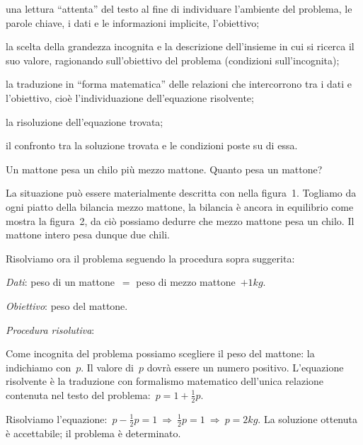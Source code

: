 \begin{enumeratea}
\item una lettura ``attenta'' del
testo al fine di individuare l'ambiente del problema,
le parole chiave, i dati e le informazioni implicite,
l'obiettivo;
\item la scelta della grandezza incognita e la descrizione
dell'insieme in cui si ricerca il suo valore,
ragionando sull'obiettivo del problema (condizioni sull'incognita);
\item la traduzione in ``forma matematica'' delle relazioni che intercorrono tra i
dati e l'obiettivo, cioè l'individuazione dell'equazione risolvente;
\item la risoluzione dell'equazione trovata;
\item il confronto tra la soluzione trovata e le condizioni poste su di essa.
\end{enumeratea}

\begin{problema}
 Un mattone pesa un chilo più mezzo mattone. Quanto pesa un mattone?
\end{problema}

\begin{soluzione}
 La situazione può essere materialmente descritta con nella figura~1.
Togliamo da ogni piatto della bilancia mezzo mattone, la bilancia è
ancora in equilibrio come mostra la figura~2, da ciò possiamo
dedurre che mezzo mattone pesa un chilo. Il mattone intero pesa dunque
due chili.
\begin{center}
 
\end{center}

Risolviamo ora il problema seguendo la procedura sopra suggerita:

\emph{Dati}: peso di un mattone~$=$ peso di mezzo mattone~$+ 1\unit{kg}.$

\emph{Obiettivo}: peso del mattone.

\emph{Procedura risolutiva}:

Come incognita del problema possiamo scegliere il peso del mattone: la
indichiamo con~$p$.
Il valore di~$p$ dovrà essere un numero positivo.
L'equazione risolvente è la traduzione con formalismo
matematico dell'unica relazione contenuta nel testo del
problema:~$p=1+\frac{1}{2}p$.

Risolviamo l'equazione:~$p-\frac{1}{2}p=1\:\Rightarrow\:\frac{1}{2}p=1\:\Rightarrow\: p=2\unit{kg}.$
La soluzione ottenuta è accettabile; il problema è determinato.
\end{soluzione}


